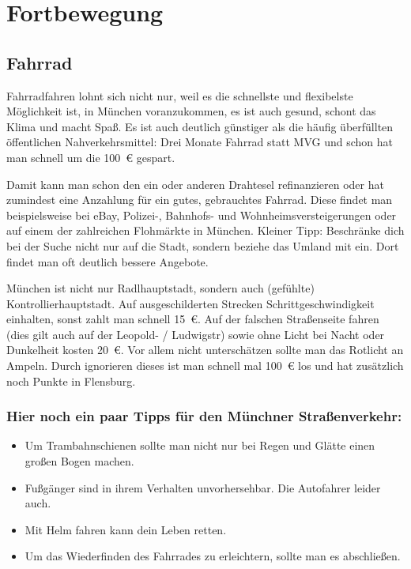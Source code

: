 ﻿
\chapter{Fortbewegung}

\section{Fahrrad}

Fahrradfahren lohnt sich nicht nur, weil es die schnellste und
flexibelste Möglichkeit ist, in München voranzukommen, es ist auch
gesund, schont das Klima und macht Spaß.  Es ist auch deutlich
günstiger als die häufig überfüllten öffentlichen Nahverkehrsmittel:
Drei Monate Fahrrad statt MVG und schon hat man schnell um die 100~€
gespart.

Damit kann man schon den ein oder anderen Drahtesel refinanzieren oder
hat zumindest eine Anzahlung für ein gutes, gebrauchtes Fahrrad. Diese
findet man beispielsweise bei eBay, Polizei-, Bahnhofs- und
Wohnheimsversteigerungen oder auf einem der zahlreichen Flohmärkte in
München. Kleiner Tipp: Beschränke dich bei der Suche nicht nur auf die
Stadt, sondern beziehe das Umland mit ein. Dort findet man oft
deutlich bessere Angebote.

München ist nicht nur Radlhauptstadt, sondern auch (gefühlte) Kontrollierhauptstadt. Auf ausgeschilderten Strecken Schrittgeschwindigkeit einhalten, sonst zahlt man schnell 15~€. Auf der falschen Straßenseite fahren (dies gilt auch auf der Leopold- / Ludwigstr) sowie ohne Licht bei Nacht oder Dunkelheit kosten 20~€.
Vor allem nicht unterschätzen sollte man das Rotlicht an Ampeln. Durch ignorieren dieses ist man schnell mal 100~€ los und hat zusätzlich noch Punkte in Flensburg.

\subsection*{Hier noch ein paar Tipps für den Münchner Straßenverkehr:}
\begin{itemize}
	\item Um Trambahnschienen sollte man nicht nur bei Regen und Glätte einen großen Bogen machen.
	\item Fußgänger sind in ihrem Verhalten unvorhersehbar. Die Autofahrer leider auch.
	\item Mit Helm fahren kann dein Leben retten.
	\item Um das Wiederfinden des Fahrrades zu erleichtern, sollte man es abschließen.
	
\end{itemize}

